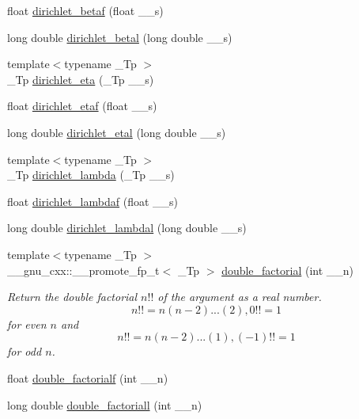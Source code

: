 \begin{DoxyCompactItemize}
float \hyperlink{group__gnu__math__spec__func_ga9bb40e20b18e3eb822e70af955940830}{dirichlet\+\_\+betaf} (float \+\_\+\+\_\+s)
\item 
long double \hyperlink{group__gnu__math__spec__func_gaed6fd85a4577f4de66d74742a1850a13}{dirichlet\+\_\+betal} (long double \+\_\+\+\_\+s)
\item 
{\footnotesize template$<$typename \+\_\+\+Tp $>$ }\\\+\_\+\+Tp \hyperlink{group__gnu__math__spec__func_gae46e26e4107675d285c79a2d6202e6c7}{dirichlet\+\_\+eta} (\+\_\+\+Tp \+\_\+\+\_\+s)
\item 
float \hyperlink{group__gnu__math__spec__func_ga6f05d076600b1de9193e586cf89547c9}{dirichlet\+\_\+etaf} (float \+\_\+\+\_\+s)
\item 
long double \hyperlink{group__gnu__math__spec__func_ga408e2267b648f29445522dbafb7a0e1a}{dirichlet\+\_\+etal} (long double \+\_\+\+\_\+s)
\item 
{\footnotesize template$<$typename \+\_\+\+Tp $>$ }\\\+\_\+\+Tp \hyperlink{group__gnu__math__spec__func_ga06842a81bdcabf9c62252dde992d42ee}{dirichlet\+\_\+lambda} (\+\_\+\+Tp \+\_\+\+\_\+s)
\item 
float \hyperlink{group__gnu__math__spec__func_gaafd3ca6b0d71d55d3835536396eece8f}{dirichlet\+\_\+lambdaf} (float \+\_\+\+\_\+s)
\item 
long double \hyperlink{group__gnu__math__spec__func_gab28d06c4e3c7457f1fa3663168678fb2}{dirichlet\+\_\+lambdal} (long double \+\_\+\+\_\+s)
\item 
{\footnotesize template$<$typename \+\_\+\+Tp $>$ }\\\+\_\+\+\_\+gnu\+\_\+cxx\+::\+\_\+\+\_\+promote\+\_\+fp\+\_\+t$<$ \+\_\+\+Tp $>$ \hyperlink{group__gnu__math__spec__func_ga08c31a5dd1686a7633b46f923c47af46}{double\+\_\+factorial} (int \+\_\+\+\_\+n)
\begin{DoxyCompactList}\small\item\em Return the double factorial $ n!! $ of the argument as a real number. \[ n!! = n(n-2)...(2), 0!! = 1 \] for even $ n $ and \[ n!! = n(n-2)...(1), (-1)!! = 1 \] for odd $ n $. \end{DoxyCompactList}\item 
float \hyperlink{group__gnu__math__spec__func_ga85ec284e603f32d18970bbdbb12d5150}{double\+\_\+factorialf} (int \+\_\+\+\_\+n)
\item 
long double \hyperlink{group__gnu__math__spec__func_ga0366730a4a775256217ef1cd9d0c3a04}{double\+\_\+factoriall} (int \+\_\+\+\_\+n)

\end{DoxyCompactItemize}
